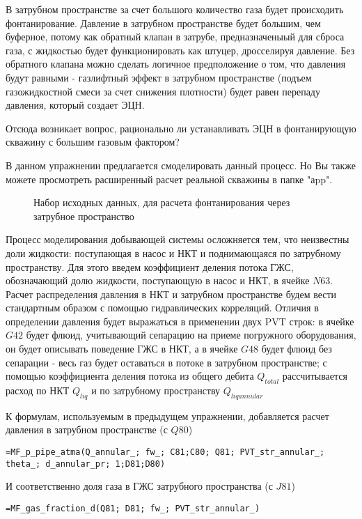 В затрубном пространстве за счет большого количество газа будет происходить фонтанирование. Давление в затрубном пространстве будет большим, чем буферное, потому как обратный клапан в затрубе, предназначеныый для сброса газа, с жидкостью будет функционировать как штуцер, дросселируя давление. Без обратного клапана можно сделать  логичное предположение о том, что давления будут равными - газлифтный эффект в затрубном пространстве (подъем газожидкостной смеси за счет снижения плотности) будет равен перепаду давления, который создает ЭЦН.

Отсюда возникает вопрос, рационально ли устанавливать ЭЦН в фонтанирующую скважину с большим газовым фактором?

В данном упражнении предлагается смоделировать данный процесс. Но Вы также можете просмотреть расширенный расчет реальной скважины в папке "аpp".

\begin{figure}[h!]
	\center{\texttt{[image: Ex110\_1]}}
	\caption{Набор исходных данных, для расчета фонтанирования через затрубное пространство}
	\label{ris:Ex110_1}
\end{figure}

Процесс моделирования добывающей системы осложняется тем, что неизвестны доли жидкости: поступающая в насос и НКТ и поднимающаяся по затрубному пространству. Для этого введем коэффициент деления потока ГЖС, обозначающий долю жидкости, поступающую в насос и НКТ, в ячейке $N63$. Расчет распределения давления в НКТ и затрубном пространстве будем вести стандартным образом с помощью гидравлических корреляций. Отличия в определении давления будет выражаться в применении двух PVT строк: в ячейке $G42$ будет флюид, учитывающий сепарацию на приеме погружного оборудования, он будет описывать поведение ГЖС в НКТ, а в ячейке $G48$ будет флюид без сепарации - весь газ будет оставаться в потоке в затрубном пространстве; с помощью коэффициента деления потока из общего дебита $Q_{total}$ рассчитывается расход по НКТ $Q_{liq}$ и по затрубному  пространству $Q_{liq annular}$

К формулам, используемым в предыдущем упражнении, добавляется расчет давления в затрубном пространстве (с $Q80$)

{ \small  \texttt{=MF\_p\_pipe\_atma(Q\_annular\_; fw\_; C81;C80; Q81; PVT\_str\_annular\_; theta\_; d\_annular\_pr; 1;D81;D80)
}}

И соответственно доля газа в ГЖС затрубного пространства (с $J81$) 

{ \small  \texttt{=MF\_gas\_fraction\_d(Q81; D81; fw\_; PVT\_str\_annular\_)
}}

